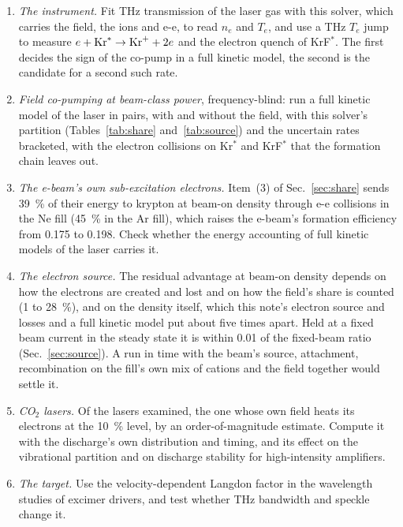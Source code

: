 \documentclass[11pt]{article}
\numberwithin{equation}{section}
\begin{document}
\begin{enumerate}
\item \emph{The instrument.} Fit THz transmission of the laser gas with this
  solver, which carries the field, the ions and e-e, to read $n_e$ and $T_e$, and
  use a THz $T_e$ jump to measure $e+{\rm Kr}^*\to{\rm Kr}^++2e$ and the electron
  quench of KrF$^*$. The first decides the sign of the
  co-pump in a full kinetic model, the second is the candidate for a second such rate.
\item \emph{Field co-pumping at beam-class power}, frequency-blind: run a full kinetic
  model of the laser in pairs, with and without the field, with this solver's partition
  (Tables~\ref{tab:share} and~\ref{tab:source}) and the uncertain rates bracketed, with the
  electron collisions on Kr$^*$ and KrF$^*$ that the formation chain leaves out.
\item \emph{The e-beam's own sub-excitation electrons.} Item~(3) of
  Sec.~\ref{sec:share} sends 39~\% of their energy to krypton at beam-on density
  through e-e collisions in the Ne fill (45~\% in the Ar fill), which raises the
  e-beam's formation efficiency from 0.175 to 0.198. Check whether the energy
  accounting of full kinetic models of the laser carries it.
\item \emph{The electron source.} The residual advantage at beam-on density depends
  on how the electrons are created and lost and on how the field's share is counted
  (1 to 28~\%), and on the density itself, which this note's electron source and losses
  and a full kinetic model put about five times apart. Held at a fixed beam current in the steady state it is within 0.01
  of the fixed-beam ratio (Sec.~\ref{sec:source}). A run in time with the beam's source,
  attachment, recombination on the fill's own mix of cations and the field together
  would settle it.
\item \emph{CO$_2$ lasers.} Of the lasers examined, the one whose own field heats
  its electrons at the 10~\% level, by an order-of-magnitude estimate. Compute it with
  the discharge's own distribution and timing, and its effect on the vibrational
  partition and on discharge stability for high-intensity amplifiers.
\item \emph{The target.} Use the velocity-dependent Langdon factor in the
  wavelength studies of excimer drivers, and test whether THz bandwidth and speckle
  change it.
\end{enumerate}

\appendix
\end{document}
